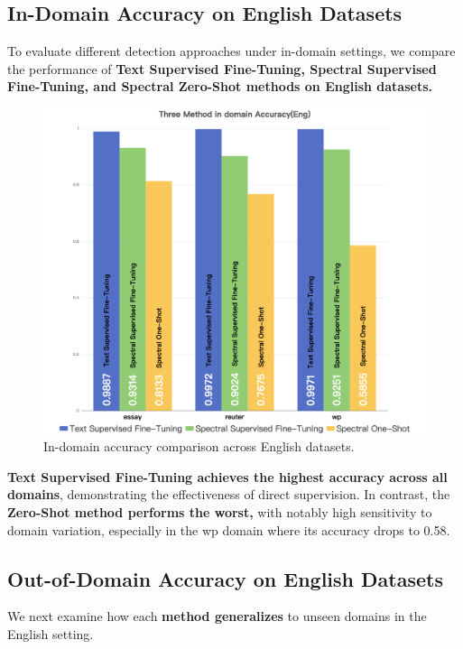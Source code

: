\documentclass[lettersize,journal]{IEEEtran}
\begin{document}
\subsection{In-Domain Accuracy on English Datasets}

To evaluate different detection approaches under in-domain settings, we compare the performance of \textbf{Text Supervised Fine-Tuning, Spectral Supervised Fine-Tuning, and Spectral Zero-Shot methods on English datasets.}


\begin{figure}[H]
    \centering
    \includegraphics[width=0.65\linewidth]{images/Three Method in domain Accuracy(Eng).png}
    \caption{In-domain accuracy comparison across English datasets.}
\end{figure}


\textbf{Text Supervised Fine-Tuning achieves the highest accuracy across all domains}, demonstrating the effectiveness of direct supervision. In contrast, the \textbf{Zero-Shot method performs the worst,} with notably high sensitivity to domain variation, especially in the wp domain where its accuracy drops to 0.58.

\subsection{Out-of-Domain Accuracy on English Datasets}

We next examine how each \textbf{method generalizes} to unseen domains in the English setting.
\end{document}
